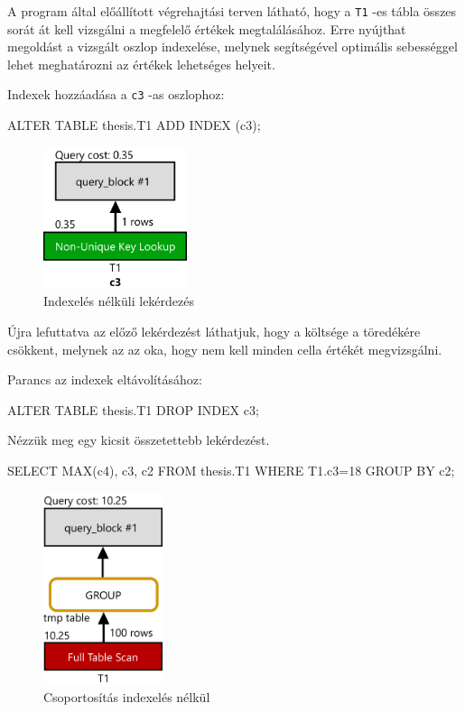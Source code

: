 A program által előállított végrehajtási terven látható, hogy a \texttt{T1} -es tábla összes sorát át kell vizsgálni a megfelelő értékek megtalálásához. Erre nyújthat megoldást a vizsgált oszlop indexelése, melynek segítségével optimális sebességgel lehet meghatározni az értékek lehetséges helyeit.

Indexek hozzáadása a \texttt{c3} -as oszlophoz:
\begin{python} 
ALTER TABLE  thesis.T1  ADD INDEX (c3);
\end{python}

\begin{figure}[h!]
\centering
\includegraphics[width=4.2cm]{images/explain/1-2.png}
\caption{Indexelés nélküli lekérdezés}
\label{fig:schema}
\end{figure}
Újra lefuttatva az előző lekérdezést láthatjuk, hogy a költsége a töredékére csökkent, melynek az az oka, hogy nem kell minden cella értékét megvizsgálni.


Parancs az indexek eltávolításához:
\begin{python} 
ALTER TABLE  thesis.T1  DROP INDEX c3;
\end{python}

\newpage
{}

Nézzük meg egy kicsit összetettebb lekérdezést.
\begin{python} 
SELECT MAX(c4), c3, c2 FROM thesis.T1 WHERE T1.c3=18 GROUP BY c2;
\end{python}

\begin{figure}[h!]
\centering
\includegraphics[width=3.5cm]{images/explain/2-1.png}
\caption{Csoportosítás indexelés nélkül}
\label{fig:schema}
\end{figure}

